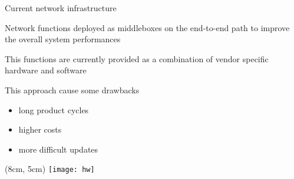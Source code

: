 \begin{frame}{Current network infrastructure}

  \vfill{}

  Network functions deployed as middleboxes on the end-to-end path to improve
  the overall system performances

  \vfill{}

  This functions are currently provided as a combination of vendor specific
  hardware and software

  \vfill{}

  This approach cause some drawbacks
  \begin{itemize}
    \item long product cycles
    \item higher costs
    \item more difficult updates
  \end{itemize}

  \vfill{}

  \begin{textblock*}{1cm}(8cm, 5cm)
    \texttt{[image: hw]}
  \end{textblock*}

\end{frame}